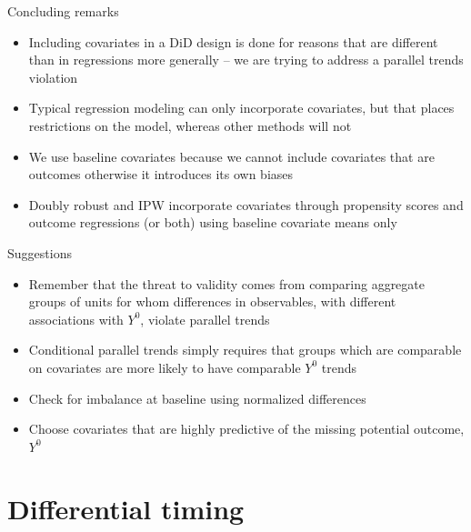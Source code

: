 \documentclass{beamer}
\begin{document}
\begin{frame}{Concluding remarks}

\begin{itemize}
\item Including covariates in a DiD design is done for reasons that are different than in regressions more generally -- we are trying to address a parallel trends violation
\item Typical regression modeling can only incorporate covariates, but that places restrictions on the model, whereas other methods will not
\item We use baseline covariates because we cannot include covariates that are outcomes otherwise it introduces its own biases
\item Doubly robust and IPW incorporate covariates through propensity scores and outcome regressions (or both) using baseline covariate means only
\end{itemize}

\end{frame}

\begin{frame}{Suggestions}

\begin{itemize}

\item Remember that the threat to validity comes from comparing aggregate groups of units for whom differences in observables, with different associations with $Y^0$, violate parallel trends
\item Conditional parallel trends simply requires that groups which are comparable on covariates are more likely to have comparable $Y^0$ trends
\item Check for imbalance at baseline using normalized differences
\item Choose covariates that are highly predictive of the missing potential outcome, $Y^0$

\end{itemize}

\end{frame}



\section{Differential timing} 
\end{document}
